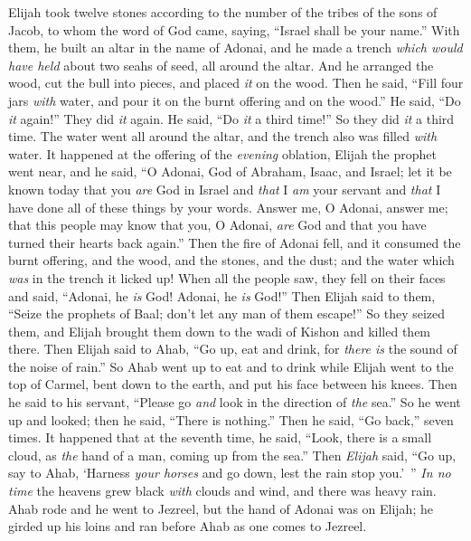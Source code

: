 \begin{biblechapter}
\verse Elijah took twelve stones according to the number of the tribes of the sons of Jacob, to whom the word of God came, saying, “Israel shall be your name.”
\verse With them, he built an altar in the name of Adonai, and he made a trench \textit{which would have held} about two seahs of seed, all around the altar.
\verse And he arranged the wood, cut the bull into pieces, and placed \textit{it} on the wood. Then he said, “Fill four jars \textit{with} water, and pour it on the burnt offering and on the wood.”
\verse He said, “Do \textit{it} again!” They did \textit{it} again. He said, “Do \textit{it} a third time!” So they did \textit{it} a third time.
\verse The water went all around the altar, and the trench also was filled \textit{with} water.
\verse It happened at the offering of the \textit{evening} oblation, Elijah the prophet went near, and he said, “O Adonai, God of Abraham, Isaac, and Israel; let it be known today that you \textit{are} God in Israel and \textit{that} I \textit{am} your servant and \textit{that} I have done all of these things by your words.
\verse Answer me, O Adonai, answer me; that this people may know that you, O Adonai, \textit{are} God and that you have turned their hearts back again.”
\verse Then the fire of Adonai fell, and it consumed the burnt offering, and the wood, and the stones, and the dust; and the water which \textit{was} in the trench it licked up!
\verse When all the people saw, they fell on their faces and said, “Adonai, he \textit{is} God! Adonai, he \textit{is} God!”
\verse Then Elijah said to them, “Seize the prophets of Baal; don’t let any man of them escape!” So they seized them, and Elijah brought them down to the wadi of Kishon and killed them there.
\verse Then Elijah said to Ahab, “Go up, eat and drink, for \textit{there is} the sound of the noise of rain.”
\verse So Ahab went up to eat and to drink while Elijah went to the top of Carmel, bent down to the earth, and put his face between his knees.
\verse Then he said to his servant, “Please go \textit{and} look in the direction of \textit{the} sea.” So he went up and looked; then he said, “There is nothing.” Then he said, “Go back,” seven times.
\verse It happened that at the seventh time, he said, “Look, there is a small cloud, as \textit{the} hand of a man, coming up from the sea.” Then \textit{Elijah} said, “Go up, say to Ahab, ‘Harness \textit{your horses} and go down, lest the rain stop you.’ ”
\verse \textit{In no time} the heavens grew black \textit{with} clouds and wind, and there was heavy rain. Ahab rode and he went to Jezreel,
\verse but the hand of Adonai was on Elijah; he girded up his loins and ran before Ahab as one comes to Jezreel.
\end{biblechapter}

